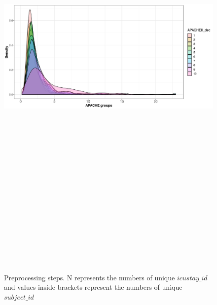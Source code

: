 \documentclass[10pt,a4paper]{article}
\begin{document}
\begin{figure}[htp]
\begin{center}
  \includegraphics[width=14cm,height=23cm]{images/distribution_APACHEgroups.png}
\end{center}
\caption{Preprocessing steps. N represents the numbers of unique $icustay\_id$ and values inside brackets represent the numbers of unique $subject\_id$}
\label{fig:preprocessingPipeline}
\end{figure}
\end{document}
